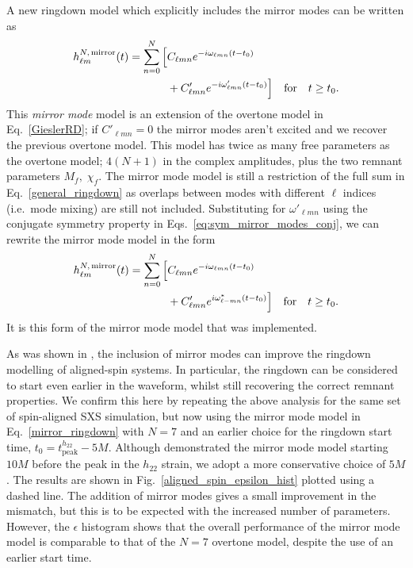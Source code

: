 A new ringdown model which explicitly includes the mirror modes can be written as
\begin{align}
    h_{\ell m}^{N,\, {\rm mirror}}(t) = \sum_{n=0}^N \Big[& C_{\ell m n} e^{-i \omega_{\ell m n}(t-t_0)} \\ &+ C'_{\ell m n} e^{-i \omega'_{\ell m n}(t-t_0)} \Big]\quad \textrm{for} \quad t \geq t_0. \nonumber
\end{align}
This \emph{mirror mode} model is an extension of the overtone model in Eq.~\ref{GieslerRD};
if $C'_{\ell m n} = 0$ the mirror modes aren't excited and we recover the previous overtone model. 
This model has twice as many free parameters as the overtone model; $4(N+1)$ in the complex amplitudes, plus the two remnant parameters $M_f,\; \chi_f$.
The mirror mode model is still a restriction of the full sum in Eq.~\ref{general_ringdown} as overlaps between modes with different $\ell$ indices (i.e.\ mode mixing) are still not included.
Substituting for $\omega'_{\ell m n}$ using the conjugate symmetry property in Eqs.~\ref{eq:sym_mirror_modes_conj}, we can rewrite the mirror mode model in the form
\begin{align} \label{mirror_ringdown}
   h_{\ell m}^{N,\, {\rm mirror}}(t) = \sum_{n=0}^N \Big[& C_{\ell m n} e^{-i \omega_{\ell m n}(t-t_0)} \\ &+ C'_{\ell m n} e^{i \omega^*_{\ell -m n}(t-t_0)} \Big]\quad \textrm{for} \quad t \geq t_0. \nonumber
\end{align}
It is this form of the mirror mode model that was implemented.

As was shown in \cite{Dhani:2020nik}, the inclusion of mirror modes can improve the ringdown modelling of aligned-spin systems. In particular, the ringdown can be considered to start even earlier in the waveform, whilst still recovering the correct remnant properties. We confirm this here by repeating the above analysis for the same set of spin-aligned SXS simulation, but now using the mirror mode model in Eq.~\ref{mirror_ringdown} with $N=7$ and an earlier choice for the ringdown start time, $t_0 = t_{\mathrm{peak}}^{h_{22}} - 5M$.
Although \cite{Dhani:2020nik} demonstrated the mirror mode model starting $10M$ before the peak in the $h_{22}$ strain, we adopt a more conservative choice of $5M$.
The results are shown in Fig.~\ref{aligned_spin_epsilon_hist} plotted using a dashed line. 
The addition of mirror modes gives a small improvement in the mismatch, but this is to be expected with the increased number of parameters.
However, the $\epsilon$ histogram shows that the overall performance of the mirror mode model is comparable to that of the $N=7$ overtone model, despite the use of an earlier start time.


